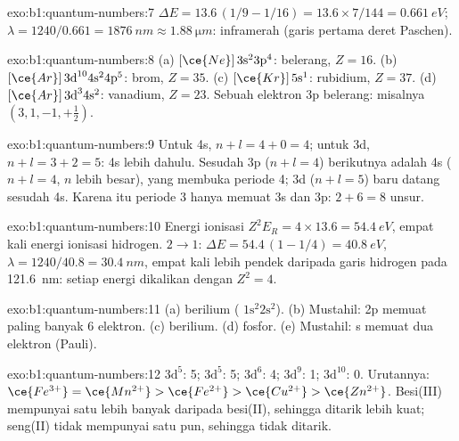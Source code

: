 \begin{solution}{exo:b1:quantum-numbers:7}
$\Delta E = 13.6\,(1/9 - 1/16) = 13.6 \times 7/144 = \qty{0.661}{eV}$;
$\lambda = 1240/0.661 = \qty{1876}{nm} \approx \qty{1.88}{\micro m}$:
inframerah (garis pertama deret Paschen).
\end{solution}

\begin{solution}{exo:b1:quantum-numbers:8}
(a) $[\ce{Ne}]\,3\text{s}^2 3\text{p}^4$: belerang, $Z = 16$.
(b) $[\ce{Ar}]\,3\text{d}^{10} 4\text{s}^2 4\text{p}^5$: brom, $Z = 35$.
(c) $[\ce{Kr}]\,5\text{s}^1$: rubidium, $Z = 37$.
(d) $[\ce{Ar}]\,3\text{d}^3 4\text{s}^2$: vanadium, $Z = 23$.
Sebuah elektron 3p belerang: misalnya $(3, 1, -1, +\tfrac12)$.
\end{solution}

\begin{solution}{exo:b1:quantum-numbers:9}
Untuk 4s, $n + l = 4 + 0 = 4$; untuk 3d, $n + l = 3 + 2 = 5$: 4s lebih
dahulu. Sesudah 3p ($n + l = 4$)  berikutnya adalah 4s
($n + l = 4$, $n$ lebih besar), yang membuka periode 4; 3d ($n + l = 5$)
baru datang sesudah 4s. Karena itu periode 3 hanya memuat 3s dan 3p:
$2 + 6 = 8$ unsur.
\end{solution}

\begin{solution}{exo:b1:quantum-numbers:10}
Energi ionisasi $Z^2E_R = 4 \times 13.6 = \qty{54.4}{eV}$, empat kali
energi ionisasi hidrogen. $2 \to 1$: $\Delta E = 54.4\,(1 - 1/4) = \qty{40.8}{eV}$,
$\lambda = 1240/40.8 = \qty{30.4}{nm}$, empat kali lebih pendek daripada
garis hidrogen pada \qty{121.6}{nm}: setiap energi dikalikan dengan
$Z^2 = 4$.
\end{solution}

\begin{solution}{exo:b1:quantum-numbers:11}
(a)  berilium ( $1\text{s}^2 2\text{s}^2$).
(b) Mustahil: 2p memuat paling banyak 6 elektron. (c) 
berilium. (d)  fosfor. (e) Mustahil:  s memuat dua
elektron (Pauli).
\end{solution}

\begin{solution}{exo:b1:quantum-numbers:12}
 $3\text{d}^5$: 5;  $3\text{d}^5$: 5; 
$3\text{d}^6$: 4;  $3\text{d}^9$: 1; 
$3\text{d}^{10}$: 0. Urutannya: $\ce{Fe^{3+}} = \ce{Mn^{2+}} > \ce{Fe^{2+}}
> \ce{Cu^{2+}} > \ce{Zn^{2+}}$. Besi(III) mempunyai satu  lebih banyak daripada besi(II), sehingga ditarik lebih kuat;
seng(II) tidak mempunyai satu pun, sehingga tidak ditarik.
\end{solution}

